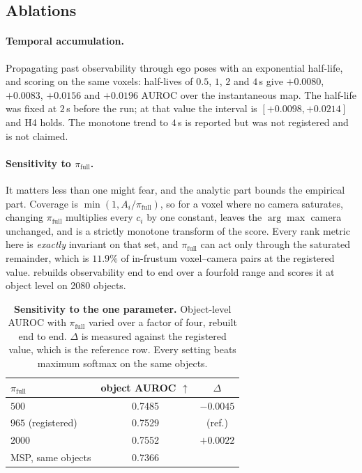 \documentclass[10pt,twocolumn,letterpaper]{article}
\begin{document}
\subsection{Ablations}
\label{sec:ablations}

\paragraph{Temporal accumulation.} Propagating past observability through
ego poses with an exponential half-life, and scoring on the same voxels:
half-lives of $0.5$, $1$, $2$ and $4$\,s give $+0.0080$, $+0.0083$,
$+0.0156$ and $+0.0196$ AUROC over the instantaneous map. The half-life was
fixed at $2$\,s before the run; at that value the interval is
$[+0.0098, +0.0214]$ and H4 holds. The monotone trend to $4$\,s is reported
but was not registered and is not claimed.

\paragraph{Sensitivity to $\pi_{\text{full}}$.} It matters less than one might fear,
and the analytic part bounds the empirical part. Coverage is
$\min(1, A_i/\pi_{\text{full}})$, so for a voxel where no camera saturates,
changing $\pi_{\text{full}}$ multiplies every $c_i$ by one constant, leaves
the $\arg\max$ camera unchanged, and is a strictly monotone transform of the
score. Every rank metric here is \emph{exactly} invariant on that set, and
$\pi_{\text{full}}$ can act only through the saturated remainder, which is
$11.9\%$ of in-frustum voxel--camera pairs at the registered value.
 rebuilds observability end to end over a fourfold range
and scores it at object level on 2080 objects.

\begin{table}[t]
\centering\small
\begin{tabular}{lcc}
\toprule
$\pi_{\text{full}}$ & object AUROC $\uparrow$ & $\Delta$ \\
\midrule
$500$   & 0.7485 & $-0.0045$ \\
$965$ \;(registered) & 0.7529 & (ref.) \\
$2000$  & 0.7552 & $+0.0022$ \\
\midrule
MSP, same objects & 0.7366 & \\
\bottomrule
\end{tabular}
\caption{\textbf{Sensitivity to the one parameter.} Object-level AUROC with $\pi_{\text{full}}$ varied over a factor of four, rebuilt end to end. $\Delta$ is measured against the registered value, which is the reference row. Every setting beats maximum softmax on the same objects.}
\label{tab:pifull}
\end{table}
\end{document}
